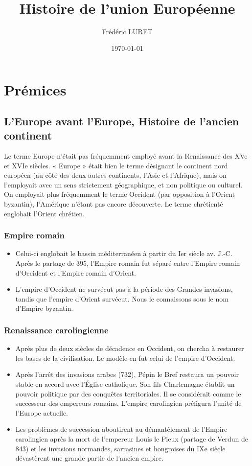 \documentclass{report}%
\author{Frédéric LURET}
\title{Histoire de l’union Européenne}
\date{\today}
\begin{document}
\maketitle

\tableofcontents
\thispagestyle{empty}
\newpage
\chapter{Prémices}

\section{L'Europe avant l'Europe, Histoire de l'ancien continent}
Le terme Europe n'était pas fréquemment employé avant la Renaissance des XVe et XVIe siècles. « Europe » était bien le terme désignant le continent nord européen (au côté des deux autres continents, l'Asie et l'Afrique), mais on l'employait avec un sens strictement géographique, et non politique ou culturel. On employait plus fréquemment le terme Occident (par opposition à l'Orient byzantin), l'Amérique n'étant pas encore découverte. Le terme chrétienté englobait l'Orient chrétien.
\subsection{Empire romain}
	\begin{itemize}
		\item Celui-ci englobait le bassin méditerranéen à partir du Ier siècle av. J.‑C. Après le partage de 395, l'Empire romain fut séparé entre l'Empire romain d'Occident et l'Empire romain d'Orient.
		\item L'empire d'Occident ne survécut pas à la période des Grandes invasions, tandis que l'empire d'Orient survécut. Nous le connaissons sous le nom d'Empire byzantin.
	\end{itemize}
\subsection{Renaissance carolingienne}
	\begin{itemize}
		\item Après plus de deux siècles de décadence en Occident, on chercha à restaurer les bases de la civilisation. Le modèle en fut celui de l'empire d'Occident.
		\item Après l'arrêt des invasions arabes (732), Pépin le Bref restaura un pouvoir stable en accord avec l'Église catholique. Son fils Charlemagne établit un pouvoir politique par des conquêtes territoriales. Il se considérait comme le successeur des empereurs romains. L'empire carolingien préfigura l'unité de l'Europe actuelle.
		\item Les problèmes de succession aboutirent au démantèlement de l'Empire carolingien après la mort de l'empereur Louis le Pieux (partage de Verdun de 843) et les invasions normandes, sarrasines et hongroises du IXe siècle dévastèrent une grande partie de l'ancien empire.
	\end{itemize}
\end{document}
